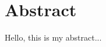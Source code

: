 \documentclass[../main.tex]{subfiles}
\begin{document}
\section{Abstract}

Hello, this is my abstract...
\end{document}
